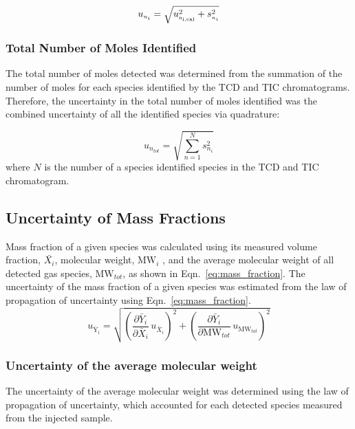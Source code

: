 \documentclass[12pt]{article}
\begin{document}
\begin{equation}
\label{eq:gasspeciesuncertaintycertainty}
u_{\scriptscriptstyle n_{i}} = \sqrt{ u_{\rm \scriptscriptstyle n_{i,cal}}^2 + s_{\scriptscriptstyle n_{i}}^2}
\end{equation}

\subsubsection{Total Number of Moles Identified}
\label{ssec:Total Number of Moles Identified}
The total number of moles detected was determined from the summation of the number of moles for each species identified by the TCD and TIC chromatograms. Therefore, the uncertainty in the total number of moles identified was the combined uncertainty of all the identified species via quadrature:

\begin{equation}
\label{eq:totalnumberofmolesdetected}
u_{\scriptscriptstyle n_{tot}}=\sqrt{{\sum_{n=1}^{N} s_{\scriptscriptstyle n_{i}}^2}}
\end{equation}
where $N$ is the number of a species identified species in the TCD and TIC chromatogram.

\subsection{Uncertainty of Mass Fractions}
\label{ssec:Uncertainty of Mass Fractions}
Mass fraction of a given species was calculated using its measured volume fraction, $\bar{X_{i}}$, molecular weight, $\textrm{MW}_i$ , and the average molecular weight of all detected gas species, $\textrm{MW}_{tot}$, as shown in Eqn.~\ref{eq:mass_fraction}. The uncertainty of the mass fraction of a given species was estimated from the law of propagation of uncertainty using Eqn.~\ref{eq:mass_fraction}.
\begin{equation}\label{eq:Mass_Frac_Uncertainty}
u_\mathrm{\bar{Y}_{i}} = \sqrt{{\left( \frac{\partial \bar{Y}_{i}}{\partial \bar{X}_{i}}\,u_{\scriptscriptstyle \bar{X}_{i}} \right)}^2+{\left(\frac{\partial \bar{Y}_{i}}{\partial \textrm{MW}_{tot}}\,u_{\scriptscriptstyle \textrm{MW}_{tot}}\right)}^2}
\end{equation}

\subsubsection{Uncertainty of the average molecular weight}
\label{ssec:Uncertainty of the average molecular weight}
The uncertainty of the average molecular weight was determined using the law of propagation of uncertainty, which accounted for each detected species measured from the injected sample.
\end{document}
